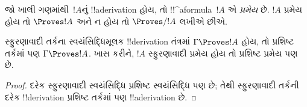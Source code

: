 \documentclass[../../../include/open-logic-section]{subfiles}
\begin{document}
\begin{defn}[પ્રમેયો]
જો ખાલી ગણમાંથી~$!A$નું !!a{derivation} હોય, તો
!!^a{formula}~$!A$ એ \emph{પ્રમેય} છે. $!A$ પ્રમેય
હોય તો $\Proves !A$ અને ન હોય તો $\Proves/ !A$ લખીએ છીએ.
\end{defn}

\begin{prop}
  સ્ફુરણાવાદી તર્કના સ્વયંસિદ્ધિમૂલક !!{derivation} તંત્રમાં
  $\Gamma \Proves !A$ હોય, તો પ્રશિષ્ટ તર્કમાં પણ
  $\Gamma \Proves !A$. ખાસ કરીને, $!A$ સ્ફુરણાવાદી
  પ્રમેય હોય તો પ્રશિષ્ટ પ્રમેય પણ છે.
\end{prop}

\begin{proof}
  દરેક સ્ફુરણાવાદી સ્વયંસિદ્ધિ પ્રશિષ્ટ સ્વયંસિદ્ધિ પણ છે;
  તેથી સ્ફુરણાવાદી તર્કની દરેક !!{derivation} પ્રશિષ્ટ
  તર્કમાં પણ !!a{derivation} છે.
\end{proof}
\end{document}
